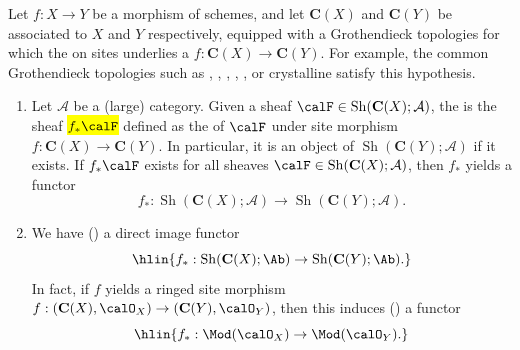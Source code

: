 \begin{definition}  \label{definition:inverse_image_and_direct_image_of_sheaves_on_schemes_for_various_topologies}
Let $f : X \to Y$ be a morphism of schemes, and let $\mathbf{C}(X)$ and $\mathbf{C}(Y)$ be  associated to $X$ and $Y$ respectively, equipped with a Grothendieck topologies for which the   on sites underlies a  $f: \mathbf{C}(X) \to \mathbf{C}(Y)$. For example, the common Grothendieck topologies such as , , , , , or crystalline satisfy this hypothesis. 

\begin{enumerate}

    \item 
    Let $\mathcal{A}$ be a (large) category.
    Given a sheaf $\calF \in \operatorname{Sh}(\mathbf{C}(X); \mathcal{A})$, the  is the sheaf \hl{$f_* \calF$} defined as the  of $\calF$ under site morphism $f: \mathbf{C}(X) \to \mathbf{C}(Y)$.
    In particular, it is an object of $\operatorname{Sh}(\mathbf{C}(Y); \mathcal{A})$ if it exists. If $f_* \calF$ exists for all sheaves $\calF \in \operatorname{Sh}(\mathbf{C}(X); \mathcal{A})$, then $f_*$ yields a functor
    $$f_* : \operatorname{Sh}(\mathbf{C}(X); \mathcal{A}) \to \operatorname{Sh}(\mathbf{C}(Y); \mathcal{A}).$$

    \item We have () a direct image functor 
    $$\hlin{f_* : \operatorname{Sh}(\mathbf{C}(X); \Ab) \to \operatorname{Sh}(\mathbf{C}(Y); \Ab).}$$
    In fact, if $f$ yields a ringed site morphism $f: (\mathbf{C}(X), \calO_X) \to (\mathbf{C}(Y), \calO_Y)$, then this induces () a functor
    $$\hlin{f_* : \Mod(\calO_X) \to \Mod(\calO_Y).}$$


\end{enumerate}
\end{definition}
